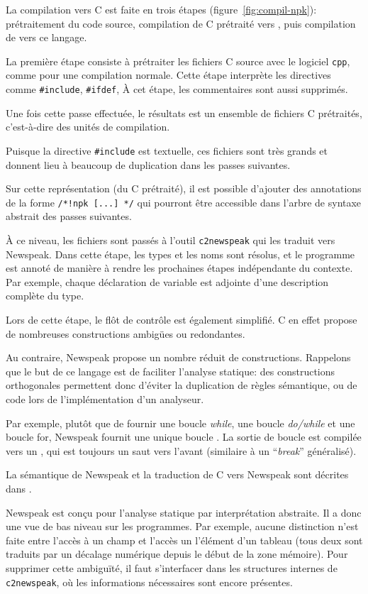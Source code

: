 
La compilation vers C est faite en trois étapes (figure~\ref{fig:compil-npk}):
prétraitement du code source, compilation de C prétraité vers \newspeak{}, puis
compilation de \newspeak{} vers ce langage.

La première étape consiste à prétraiter les fichiers C source avec le logiciel
\texttt{cpp}, comme pour une compilation normale. Cette étape interprète les
directives comme \texttt{\#include}, \texttt{\#ifdef}, À cet étape, les
commentaires sont aussi supprimés.

Une fois cette passe effectuée, le résultats est un ensemble de fichiers C
prétraités, c'est-à-dire des unités de compilation.

Puisque la directive \texttt{\#include} est textuelle, ces fichiers sont très
grands et donnent lieu à beaucoup de duplication dans les passes suivantes.

Sur cette représentation (du C prétraité), il est possible d'ajouter des
annotations de la forme \texttt{/*!npk [...] */} qui pourront être accessible
dans l'arbre de syntaxe abstrait des passes suivantes.

À ce niveau, les fichiers sont passés à l'outil \texttt{c2newspeak} qui les
traduit vers Newspeak. Dans cette étape, les types et les noms sont résolus, et
le programme est annoté de manière à rendre les prochaines étapes indépendante
du contexte. Par exemple, chaque déclaration de variable est adjointe d'une
description complète du type.

Lors de cette étape, le flôt de contrôle est également simplifié. C en effet
propose de nombreuses constructions ambigües ou redondantes.

Au contraire, Newspeak propose un nombre réduit de constructions. Rappelons que
le but de ce langage est de faciliter l'analyse statique: des constructions
orthogonales permettent donc d'éviter la duplication de règles sémantique, ou de
code lors de l'implémentation d'un analyseur.

Par exemple, plutôt que de fournir une boucle \emph{while}, une boucle
\emph{do/while} et une boucle for, Newspeak fournit une unique boucle
\npkWhile{}. La sortie de boucle est compilée vers un \npkGoto{}\cite{goto}, qui
est toujours un saut vers l'avant (similaire à un ``\emph{break}'' généralisé).

La sémantique de Newspeak et la traduction de C vers Newspeak sont décrites dans
\cite{newspeak}.

Newspeak est conçu pour l'analyse statique par interprétation abstraite. Il a
donc une vue de bas niveau sur les programmes. Par exemple, aucune distinction
n'est faite entre l'accès à un champ et l'accès un l'élément d'un tableau (tous
deux sont traduits par un décalage numérique depuis le début de la zone
mémoire). Pour supprimer cette ambiguïté, il faut s'interfacer dans les
structures internes de \texttt{c2newspeak}, où les informations nécessaires sont
encore présentes.

